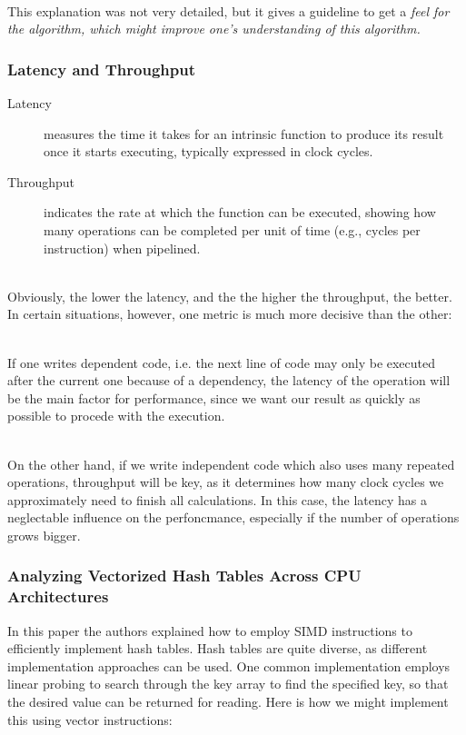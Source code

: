 \documentclass[../../main.tex]{subfiles}
\begin{document}
~\\
This explanation was not very detailed, but it gives a guideline to get a \em feel \em for the algorithm, which might improve one's understanding of this algorithm.


\bigskip
\subsubsection{Latency and Throughput}
\begin{description}
    \item[Latency] measures the time it takes for an intrinsic function to produce its result once it starts executing, typically expressed in clock cycles.
    \item[Throughput] indicates the rate at which the function can be executed, showing how many operations can be completed per unit of time (e.g., cycles per instruction) when pipelined.
\end{description}

~\\
Obviously, the lower the latency, and the the higher the throughput, the better. In certain situations, however, one metric is much more decisive than the other:

~\\
If one writes dependent code, i.e. the next line of code may only be executed after the current one because of a dependency, the latency of the operation will be the main factor for performance, since we want our result as quickly as possible to procede with the execution.

~\\
On the other hand, if we write independent code which also uses many repeated operations, throughput will be key, as it determines how many clock cycles we approximately need to finish all calculations.
In this case, the latency has a neglectable influence on the perfoncmance, especially if the number of operations grows bigger.

\bigskip
\subsubsection{Analyzing Vectorized Hash Tables Across CPU Architectures}
In this paper the authors explained how to employ SIMD instructions to efficiently implement hash tables. Hash tables are quite diverse, as different implementation approaches can be used. One common implementation employs linear probing to search through the key array to find the specified key, so that the desired value can be returned for reading. Here is how we might implement this using vector instructions:
\end{document}
